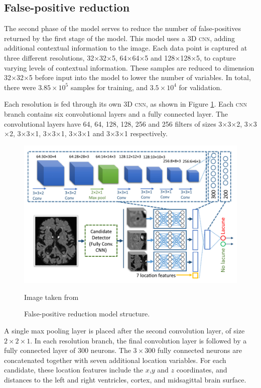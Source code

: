 \subsection*{False-positive reduction}

The second phase of the model serves to reduce the number of false-positives returned by the first stage of the model. This model uses a 3D \textsc{cnn}, adding additional contextual information to the image. Each data point is captured at three different resolutions, 32$\times$32$\times$5, 64$\times$64$\times$5 and 128$\times$128$\times$5, to capture varying levels of contextual information. These samples are reduced to dimension 32$\times$32$\times$5 before input into the model to lower the number of variables. In total, there were $3.85\times10^5$ samples for training, and $3.5\times10^4$ for validation. 

Each resolution is fed through its own 3D \textsc{cnn}, as shown in Figure \ref{litrev-ghafoorian_model2fig}. Each \textsc{cnn} branch contains six convolutional layers and a fully connected layer. The convolutional layers have 64, 64, 128, 128, 256 and 256 filters of sizes 3$\times$3$\times$2, 3$\times$3$\times$2, 3$\times$3$\times$1, 3$\times$3$\times$1, 3$\times$3$\times$1 and 3$\times$3$\times$1 respectively.

\begin{figure}[ht]
	\centering
	\includegraphics[width=\textwidth]{Images/5_ghafoorian_model2.png}
	\caption{False-positive reduction model structure.}
	\small Image taken from \cite{GhafoorianM.2017Dml3}
	\label{litrev-ghafoorian_model2fig}
\end{figure}

A single max pooling layer is placed after the second convolution layer, of size $2\times2\times1$. In each resolution branch, the final convolution layer is followed by a fully connected layer of 300 neurons. The $3\times300$ fully connected neurons are concatenated together with seven additional location variables. For each candidate, these location features include the $x$,$y$ and $z$ coordinates, and distances to the left and right ventricles, cortex, and midsagittal brain surface.

